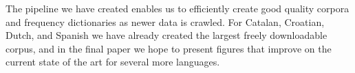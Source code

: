 \documentclass[10pt, a4paper]{article}
\begin{document}
The pipeline we have created enables us to efficiently create good quality
corpora and frequency dictionaries as newer data is crawled. For Catalan, 
Croatian, Dutch, and Spanish we have already created the largest freely
downloadable corpus, and in the final paper we hope to present figures that 
improve on the current state of the art for several more languages. 






{}
\end{document}
